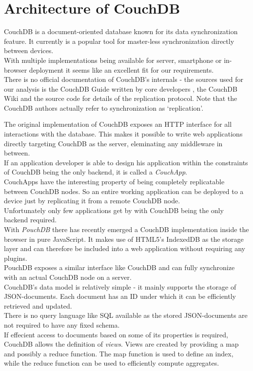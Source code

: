 \section{Architecture of CouchDB}
\label{sec:main.couchdb}
CouchDB is a document-oriented database known for its data synchronization feature.
It currently is a popular tool for master-less synchronization directly between devices.\\
With multiple implementations being available for server, smartphone or in-browser deployment it seems like an excellent fit for our requirements.\\
There is no official documentation of CouchDB's internals - the sources used for our analysis is the CouchDB Guide written by core developers \cite{anderson2010couchdb}, the CouchDB Wiki \cite{couchdb_wiki} and the source code \cite{couchdb_source} for details of the replication protocol.
Note that the CouchDB authors actually refer to synchronization as `replication'.

The original implementation of CouchDB exposes an HTTP interface for all interactions with the database.
This makes it possible to write web applications directly targeting CouchDB as the server, eleminating any middleware in between.\\
If an application developer is able to design his application within the constraints of CouchDB being the only backend, it is called a \emph{CouchApp}.\\
CouchApps have the interesting property of being completely replicatable between CouchDB nodes.
So an entire working application can be deployed to a device just by replicating it from a remote CouchDB node.\\
Unfortunately only few applications get by with CouchDB being the only backend required.\\

With \emph{PouchDB} there has recently emerged a CouchDB implementation inside the browser in pure JavaScript.
It makes use of HTML5's IndexedDB as the storage layer and can therefore be included into a web application without requiring any plugins.\\
PouchDB exposes a similar interface like CouchDB and can fully synchronize with an actual CouchDB node on a server.\\

CouchDB's data model is relatively simple - it mainly supports the storage of JSON-documents.
Each document has an ID under which it can be efficiently retrieved and updated.\\
There is no query language like SQL available as the stored JSON-documents are not required to have any fixed schema.\\
If effecient access to documents based on some of its properties is required, CouchDB allows the definition of \emph{views}.
Views are created by providing a map and possibly a reduce function.
The map function is used to define an index, while the reduce function can be used to efficiently compute aggregates.\\

